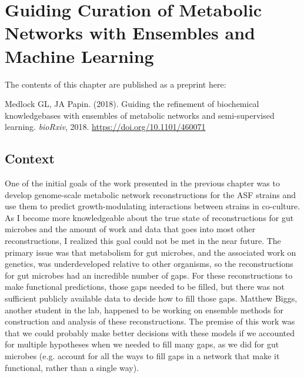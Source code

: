 \documentclass[11pt,twocolumn,notitlepage,openany,twoside]{book}
\begin{document}
\chapter{Guiding Curation of Metabolic Networks with Ensembles and Machine Learning}
\begin{refsection}

The contents of this chapter are published as a preprint here:

\medskip\noindent
Medlock GL, JA Papin. (2018). Guiding the refinement of biochemical knowledgebases with ensembles of metabolic networks and semi-supervised learning. \textit{bioRxiv}, 2018. \url{https://doi.org/10.1101/460071}


\section{Context}

One of the initial goals of the work presented in the previous chapter was to develop genome-scale metabolic network reconstructions for the ASF strains and use them to predict growth-modulating interactions between strains in co-culture. As I become more knowledgeable about the true state of reconstructions for gut microbes and the amount of work and data that goes into most other reconstructions, I realized this goal could not be met in the near future. The primary issue was that metabolism for gut microbes, and the associated work on genetics, was underdeveloped relative to other organisms, so the reconstructions for gut microbes had an incredible number of gaps. For these reconstructions to make functional predictions, those gaps needed to be filled, but there was not sufficient publicly available data to decide how to fill those gaps. Matthew Biggs, another student in the lab, happened to be working on ensemble methods for construction and analysis of these reconstructions. The premise of this work was that we could probably make better decisions with these models if we accounted for multiple hypotheses when we needed to fill many gaps, as we did for gut microbes (e.g. account for all the ways to fill gaps in a network that make it functional, rather than a single way).


\end{refsection}
\end{document}
